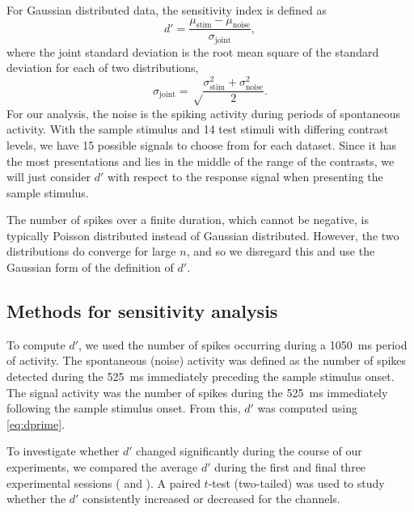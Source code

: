 For Gaussian distributed data, the sensitivity index is defined as
\begin{equation}
\label{eq:dprime}
d' = \frac{\mu_\text{stim} - \mu_\text{noise}}{\sigma_\text{joint}}
,\end{equation}
where the joint standard deviation is the root mean square of the standard deviation for each of two distributions,
\begin{equation}
\sigma_\text{joint} = \sqrt \frac{\sigma_\text{stim}^2 + \sigma_\text{noise}^2}{2}
.\end{equation}
For our analysis, the noise is the spiking activity during periods of spontaneous activity.
With the sample stimulus and 14 test stimuli with differing contrast levels, we have 15 possible signals to choose from for each dataset.
Since it has the most presentations and lies in the middle of the range of the contrasts, we will just consider $d'$ with respect to the response signal when presenting the sample stimulus.

The number of spikes over a finite duration, which cannot be negative, is typically Poisson distributed instead of Gaussian distributed.
However, the two distributions do converge for large $n$, and so we disregard this and use the Gaussian form of the definition of $d'$.

\subsection{Methods for sensitivity analysis}
\label{sec:violin_plot_method}

To compute $d'$, we used the number of spikes occurring during a \SI{1050}{\milli\second} period of activity.
The spontaneous (noise) activity was defined as the number of spikes detected during the \SI{525}{\milli\second} immediately preceding the sample stimulus onset.
The signal activity was the number of spikes during the \SI{525}{\milli\second} immediately following the sample stimulus onset.
From this, $d'$ was computed using \autoref{eq:dprime}.

To investigate whether $d'$ changed significantly during the course of our experiments, we compared the average $d'$ during the first and final three experimental sessions ( and ).
A paired $t$-test (two-tailed) was used to study whether the $d'$ consistently increased or decreased for the channels.

